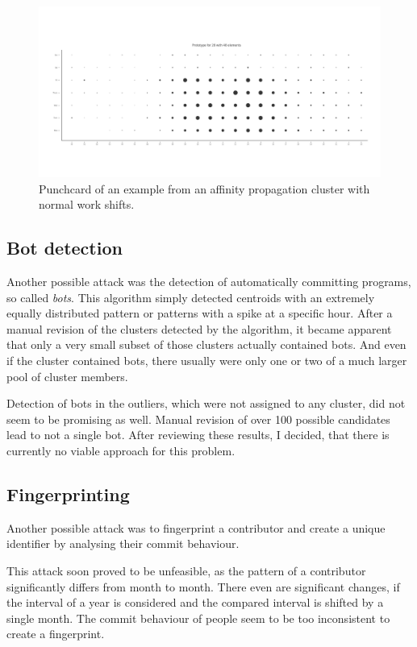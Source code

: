 \begin{figure}[H]
    \includegraphics[scale=0.32]{./graphs/analysis-affinity/28}
    \centering
    \caption{Punchcard of an example from an affinity propagation cluster with normal work shifts.}\label{fig:random-sleep-rhythm}
\end{figure}


\subsection{Bot detection}
Another possible attack was the detection of automatically committing programs, so called \emph{bots}.
This algorithm simply detected centroids with an extremely equally distributed pattern or patterns with a spike at a specific hour.
After a manual revision of the clusters detected by the algorithm, it became apparent that only a very small subset of those clusters actually contained bots.
And even if the cluster contained bots, there usually were only one or two of a much larger pool of cluster members.

Detection of bots in the outliers, which were not assigned to any cluster, did not seem to be promising as well.
Manual revision of over 100 possible candidates lead to not a single bot.
After reviewing these results, I decided, that there is currently no viable approach for this problem.


\subsection{Fingerprinting}
Another possible attack was to fingerprint a contributor and create a unique identifier by analysing their commit behaviour.

This attack soon proved to be unfeasible, as the pattern of a contributor significantly differs from month to month.
There even are significant changes, if the interval of a year is considered and the compared interval is shifted by a single month.
The commit behaviour of people seem to be too inconsistent to create a fingerprint.
